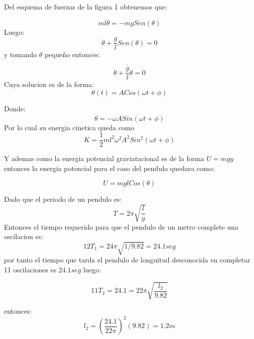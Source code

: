 \documentclass[a4paper]{article}
\begin{document}
    \begin{answer}[Problema 5.]
    
        Del esquema de fuerzas de la figura 1 obtenemos que:
        
        
        \begin{equation*}
            ml\ddot{\theta} = -mgSen(\theta)
        \end{equation*}
        Luego:
\begin{equation*}
     \ddot{\theta} + \frac{g}{l}Sen(\theta) = 0
\end{equation*}
y tomando $\theta$ pequeño  entonces:

    \begin{equation*}
     \ddot{\theta} + \frac{g}{l}\theta = 0
\end{equation*}
Cuya solucion es de la forma:
    \begin{equation*}
        \theta(t) = ACos(\omega t + \phi)
    \end{equation*}
    
    Donde:
    \begin{equation*}
        \dot{\theta} = -\omega ASin(\omega t + \phi)
    \end{equation*}
    Por lo cual su energia cinetica queda como 
    $$K = \frac{1}{2}ml^2\omega^2 A^2 Sin^2(\omega t+\phi )  $$
    
    Y ademas como la energia potencial graviatacional es de la forma $U = mgy$
    entonces la energia potencial para el caso del pendulo quedara como:
    
    \begin{equation*}
        U = mglCos(\theta)
    \end{equation*}
    
    \end{answer}
    \begin{answer}[Problema 7]
    
        Dado que el periodo de un pendulo es: 
        \begin{equation*}
            T = 2\pi \sqrt{\frac{l}{g}}
        \end{equation*}
        Entonces el tiempo requerido para que el pendulo de un metro complete una oscilacion es:
        $$12 T_1 = 24\pi\sqrt{1/9.82} = 24.1seg$$
        por tanto el tiempo que tarda el pendulo de longuitud desconocida en completar 11 oscilaciones es $24.1seg$ luego:
        
       $$11 T_2 = 24.1 = 22\pi \sqrt{\frac{l_2}{9.82}}$$
       
       entonces: 
       $$l_2 = \left(\frac{24.1}{22\pi}\right)^2(9.82) = 1.2 m$$
    \end{answer}
    
\end{document}
